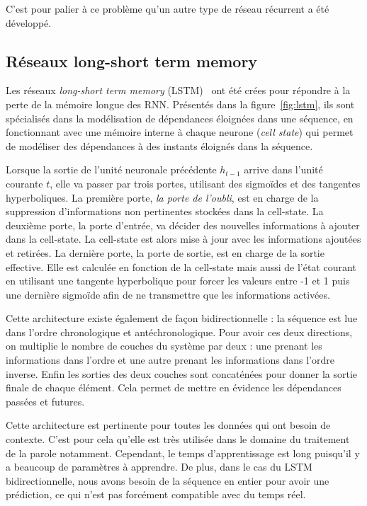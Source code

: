 C'est pour palier à ce problème qu'un autre type de réseau récurrent a été développé.

\subsection{Réseaux long-short term memory}


Les réseaux \textit{long-short term memory} (LSTM)~\cite{Hochreiter1997} ont été crées pour répondre à la perte de la mémoire longue des RNN. Présentés dans la figure~\ref{fig:lstm}, ils sont spécialisés dans la modélisation de dépendances éloignées dans une séquence, en fonctionnant avec une mémoire interne à chaque neurone (\textit{cell state}) qui permet de modéliser des dépendances à des instants éloignés dans la séquence.

Lorsque la sortie de l'unité neuronale précédente $h_{t-1}$ arrive dans l'unité courante $t$, elle va passer par trois portes, utilisant des sigmoïdes et des tangentes hyperboliques. La première porte, \textit{la porte de l'oubli}, est en charge de la suppression d'informations non pertinentes stockées dans la cell-state. La deuxième porte, la porte d'entrée, va décider des nouvelles informations à ajouter dans la cell-state. La cell-state est alors mise à jour avec les informations ajoutées et retirées. La dernière porte, la porte de sortie, est en charge de la sortie effective. Elle est calculée en fonction de la cell-state mais aussi de l'état courant en utilisant une tangente hyperbolique pour forcer les valeurs entre -1 et 1 puis une dernière sigmoïde afin de ne transmettre que les informations activées.

Cette architecture existe également de façon bidirectionnelle : la séquence est lue dans l'ordre chronologique  et antéchronologique. Pour avoir ces deux directions, on multiplie le nombre de couches du système par deux : une prenant les informations dans l'ordre et une autre prenant les informations dans l'ordre inverse. Enfin les sorties des deux couches sont concaténées pour donner la sortie finale de chaque élément. Cela permet de mettre en évidence les dépendances passées et futures.

Cette architecture est pertinente pour toutes les données qui ont besoin de contexte. C'est pour cela qu'elle est très utilisée dans le domaine du traitement de la parole notamment. Cependant, le temps d'apprentissage est long puisqu'il y a beaucoup de paramètres à apprendre. De plus, dans le cas du LSTM bidirectionnelle, nous avons besoin de la séquence en entier pour avoir une prédiction, ce qui n'est pas forcément compatible avec du temps réel.

